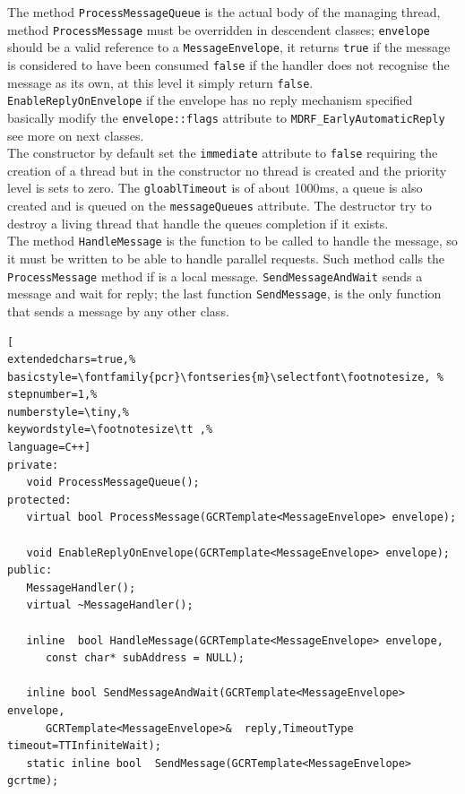 The method \texttt{ProcessMessageQueue} is the actual body of the managing thread, method \texttt{ProcessMessage} must be overridden in descendent classes; \texttt{envelope} should be a valid reference to a \texttt{MessageEnvelope}, it returns \texttt{true} if the message is considered to have been consumed \texttt{false} if the handler does not recognise the message as its own, at this level it simply return \texttt{false}. \\

\texttt{EnableReplyOnEnvelope} if the envelope has no reply mechanism specified basically modify the \texttt{envelope::flags} attribute to \texttt{MDRF\_EarlyAutomaticReply} see more on next classes. \\


The constructor by default set the \texttt{immediate} attribute to \texttt{false} requiring the creation of a thread but in the constructor no thread is created and the priority level is sets to zero. The \texttt{gloablTimeout} is of about 1000ms, a queue is also created and is queued on the \texttt{messageQueues} attribute. The destructor try to destroy a living thread that handle the queues completion if it exists. \\


The method \texttt{HandleMessage} is the function to be called to handle the message, so it must be written to be able to handle parallel requests. Such method calls the \texttt{ProcessMessage} method if is a local message.
\texttt{SendMessageAndWait} sends a message and wait for reply; the last function \texttt{SendMessage}, is the only function that sends a message by any other class.
\begin{lstlisting}[
extendedchars=true,%
basicstyle=\fontfamily{pcr}\fontseries{m}\selectfont\footnotesize, %
stepnumber=1,%
numberstyle=\tiny,%
keywordstyle=\footnotesize\tt ,%
language=C++]
private:
   void ProcessMessageQueue();
protected:
   virtual bool ProcessMessage(GCRTemplate<MessageEnvelope> envelope);

   void EnableReplyOnEnvelope(GCRTemplate<MessageEnvelope> envelope);
public:
   MessageHandler();
   virtual ~MessageHandler();

   inline  bool HandleMessage(GCRTemplate<MessageEnvelope> envelope,
      const char* subAddress = NULL);

   inline bool SendMessageAndWait(GCRTemplate<MessageEnvelope> envelope,
      GCRTemplate<MessageEnvelope>&  reply,TimeoutType timeout=TTInfiniteWait);
   static inline bool  SendMessage(GCRTemplate<MessageEnvelope> gcrtme);
\end{lstlisting}



